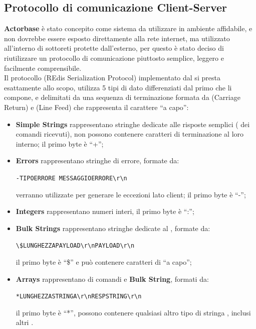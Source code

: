 \documentclass{scalatekids-article}
\begin{document}
\subsection{Protocollo di comunicazione Client-Server}
\label{sec:RESP}

\textbf{Actorbase} è stato concepito come sistema da utilizzare in ambiente
affidabile, e non dovrebbe essere esposto direttamente alla rete internet, ma
utilizzato all'interno di sottoreti protette dall'esterno, per questo è stato
deciso di riutilizzare un protocollo di comunicazione
piuttosto semplice, leggero e facilmente comprensibile.\\
Il protocollo  (REdis Serialization Protocol) implementato
dal   si presta esattamente allo scopo, utilizza
5 tipi di dato differenziati dal primo  che li compone, e delimitati
da una sequenza di terminazione formata da  (Carriage Return) e 
(Line Feed) che rappresenta il carattere ``a capo'':
\begin{itemize}
\item \textbf{Simple Strings} rappresentano stringhe dedicate alle risposte
  semplici ( dei comandi ricevuti), non possono contenere caratteri
  di terminazione al loro interno; il primo byte è ``+'';
\item \textbf{Errors} rappresentano stringhe di errore, formate da:
  \begin{center}
    \verb=-TIPOERRORE MESSAGGIOERRORE\r\n=
  \end{center}
  verranno utilizzate per generare le eccezioni lato client; il primo byte è ``-'';
\item \textbf{Integers} rappresentano numeri interi, il primo byte è ``:'';
\item \textbf{Bulk Strings} rappresentano stringhe dedicate al , formate da:
  \begin{center}
    \verb=\$LUNGHEZZAPAYLOAD\r\nPAYLOAD\r\n=
  \end{center}
  il primo byte è ``\$'' e può contenere caratteri di ``a capo'';
\item \textbf{Arrays} rappresentano  di comandi e \textbf{Bulk String}, formati da:
  \begin{center}
    \verb=*LUNGHEZZASTRINGA\r\nRESPSTRING\r\n=
  \end{center}
 il primo byte è ``*'', possono contenere qualsiasi altro tipo di stringa , inclusi altri .
\end{itemize}
\end{document}
